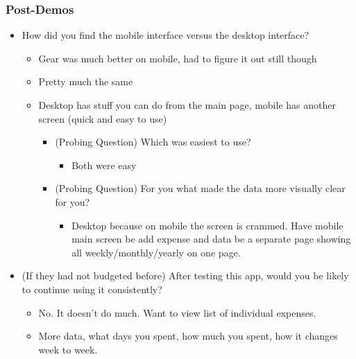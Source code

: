 \documentclass{chi2011}
\begin{document}
	\subsubsection{Post-Demos}
	\begin{itemize}[noitemsep]
		\item How did you find the mobile interface versus the desktop interface?
		\begin{itemize}[noitemsep]
			\item Gear was much better on mobile, had to figure it out still though
			\item Pretty much the same
			\item Desktop has stuff you can do from the main page, mobile has another screen (quick and easy to
				  use)
			\begin{itemize}[noitemsep]
				\item (Probing Question) Which was easiest to use?
				\begin{itemize}[noitemsep]
					\item Both were easy
				\end{itemize}
			\item (Probing Question) For you what made the data more visually clear for you?
				\begin{itemize}[noitemsep]
					\item Desktop because on mobile the screen is crammed. Have mobile main screen be add expense and data be a separate page showing all 
						  weekly/monthly/yearly on one page.
				\end{itemize}
			\end{itemize}
		\end{itemize}

		\item (If they had not budgeted before) After testing this app, would you be likely to continue using it consistently? 
		\begin{itemize}[noitemsep]
			\item No. It doesn't do much. Want to view list of individual expenses.
			\item More data, what days you spent, how much you spent, how it changes week to week.
		\end{itemize}
	\end{itemize}
	
	
	
	
	



\end{document}
